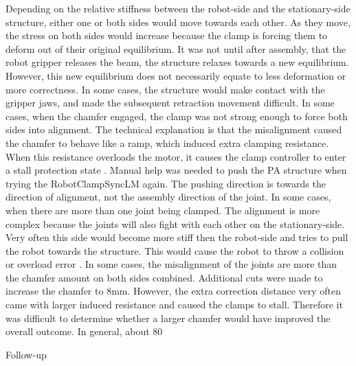 Depending on the relative stiffness between the robot-side and the stationary-side structure, either one or both sides would move towards each other. As they move, the stress on both sides would increase because the clamp is forcing them to deform out of their original equilibrium. It was not until after assembly, that the robot gripper releases the beam, the structure relaxes towards a new equilibrium. However, this new equilibrium does not necessarily equate to less deformation or more correctness. In some cases, the structure would make contact with the gripper jaws, and made the subsequent retraction movement difficult. 
In some cases, when the chamfer engaged, the clamp was not strong enough to force both sides into alignment. The technical explanation is that the misalignment caused the chamfer to behave like a ramp, which induced extra clamping resistance. When this resistance overloads the motor, it causes the clamp controller to enter a stall protection state . Manual help was needed to push the PA structure when trying the RobotClampSyncLM again. The pushing direction is towards the direction of alignment, not the assembly direction of the joint.
In some cases, when there are more than one joint being clamped. The alignment is more complex because the joints will also fight with each other on the stationary-side. Very often this side would become more stiff then the robot-side and tries to pull the robot towards the structure. This would cause the robot to throw a collision or overload error .
In some cases, the misalignment of the joints are more than the chamfer amount on both sides combined. Additional cuts were made to increase the chamfer to 8mm. However, the extra correction distance very often came with larger induced resistance and caused the clamps to stall. Therefore it was difficult to determine whether a larger chamfer would have improved the overall outcome. 
In general, about 80%

Follow-up

